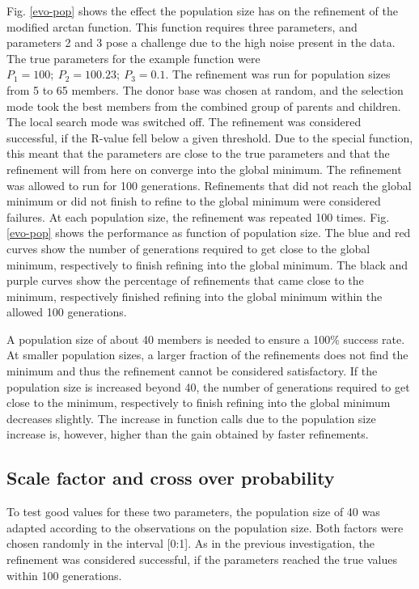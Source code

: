 Fig. \ref{evo-pop} shows the effect the population size has on the
refinement of the modified arctan function. This function requires 
three parameters, and parameters 2 and 3 pose a challenge due to the 
high noise present in the data. The true parameters for the example
function were $P_{1}=100;~P_{2}=100.23;~P_{3}=0.1$. The refinement was run
for population sizes from 5 to 65 members. The donor base was chosen
at random, and the selection mode took the best members from 
the combined group of parents and children. The local search mode was 
switched off. The refinement was
considered successful, if the R-value fell below a given threshold. 
Due to the special function, this meant that the parameters are close
to the true parameters and that the refinement will from here on 
converge into the global minimum. The refinement was allowed to run
for 100 generations. Refinements that did not reach the global minimum
or did not finish to refine to the global minimum were considered 
failures. At each population size, the refinement
was repeated 100 times. Fig. \ref{evo-pop} shows the performance as
function of population size. The blue and red curves show the number 
of generations required to get close to the global minimum, respectively 
to finish refining into the global minimum. The black and purple curves
show the percentage of refinements that came close to the minimum, 
respectively finished refining into the global minimum within the 
allowed 100 generations. 

A population size of about 40 members is needed to ensure 
a 100\% success rate. At smaller population sizes, a larger fraction of
the refinements does not find the minimum and thus the refinement 
cannot be considered satisfactory. If the population size is increased
beyond 40, the number of generations required to get close to the 
minimum, respectively to finish refining into the global minimum 
decreases slightly. The increase in function calls due to the population
size increase is, however, higher than the gain obtained by faster 
refinements.

\subsection{Scale factor and cross over probability}

To test good values for these two parameters, the population size of 
40 was adapted according to the observations on the population size.
Both factors were chosen randomly in the interval [0:1]. As in the
previous investigation, the refinement was considered successful, if
the parameters reached the true values within 100 generations.

